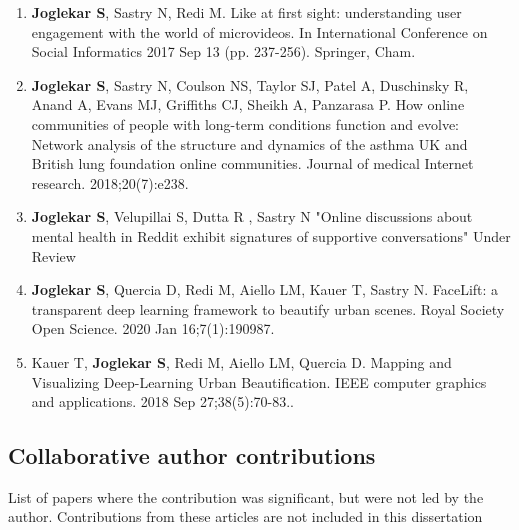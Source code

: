 \begin{enumerate}
    \item \label{vinePaper} \textbf{Joglekar S}, Sastry N, Redi M. Like at first sight: understanding user engagement with the world of microvideos. In International Conference on Social Informatics 2017 Sep 13 (pp. 237-256). Springer, Cham.
    
    \item \label{JMIR} \textbf{Joglekar S}, Sastry N, Coulson NS, Taylor SJ, Patel A, Duschinsky R, Anand A, Evans MJ, Griffiths CJ, Sheikh A, Panzarasa P. How online communities of people with long-term conditions function and evolve: Network analysis of the structure and dynamics of the asthma UK and British lung foundation online communities. Journal of medical Internet research. 2018;20(7):e238.
    
    \item \label{SREP} \textbf{Joglekar S}, Velupillai S, Dutta R , Sastry N "Online discussions about mental health in Reddit exhibit signatures of supportive conversations" Under Review
    
    \item \label{RSOS} \textbf{Joglekar S}, Quercia D, Redi M, Aiello LM, Kauer T, Sastry N. FaceLift: a transparent deep learning framework to beautify urban scenes. Royal Society Open Science. 2020 Jan 16;7(1):190987.
    
    \item \label{IEEE} Kauer T, \textbf{Joglekar S}, Redi M, Aiello LM, Quercia D. Mapping and Visualizing Deep-Learning Urban Beautification. IEEE computer graphics and applications. 2018 Sep 27;38(5):70-83..
    
\end{enumerate}

\subsection{Collaborative author contributions}
List of papers where the contribution was significant, but were not led by the author. Contributions from these articles are not included in this dissertation

